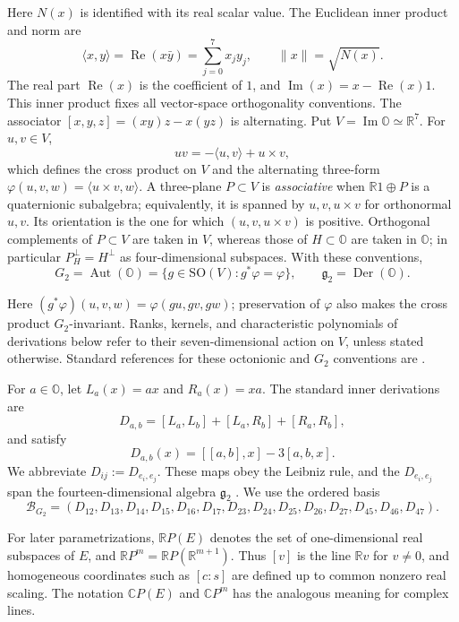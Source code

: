 \documentclass[11pt,a4paper]{article}
\newcommand{\RR}{\mathbb R}
\newcommand{\CC}{\mathbb C}
\newcommand{\OO}{\mathbb O}
\newcommand{\SO}{\mathrm{SO}}
\newcommand{\Aut}{\operatorname{Aut}}
\newcommand{\Der}{\operatorname{Der}}
\newcommand{\imO}{\operatorname{Im}\OO}
\newcommand{\braket}[2]{\langle #1,#2\rangle}
\begin{document}
Here $N(x)$ is identified with its real scalar value.  The Euclidean inner product and norm are
\[
\langle x,y\rangle=\operatorname{Re}(x\bar y)
=\sum_{j=0}^{7}x_jy_j,\qquad \|x\|=\sqrt{N(x)}.
\]
The real part $\operatorname{Re}(x)$ is the coefficient of $1$, and $\operatorname{Im}(x)=x-\operatorname{Re}(x)1$.  This inner product fixes all vector-space orthogonality conventions.
The associator $[x,y,z]=(xy)z-x(yz)$ is alternating.  Put $V=\imO\simeq\RR^7$.  For $u,v\in V$,
\[
uv=-\braket{u}{v}+u\times v,
\]
which defines the cross product on $V$ and the alternating three-form $\varphi(u,v,w)=\braket{u\times v}{w}$.  A three-plane $P\subset V$ is \emph{associative} when $\RR1\oplus P$ is a quaternionic subalgebra; equivalently, it is spanned by $u,v,u\times v$ for orthonormal $u,v$.  Its orientation is the one for which $(u,v,u\times v)$ is positive.  Orthogonal complements of $P\subset V$ are taken in $V$, whereas those of $H\subset\OO$ are taken in $\OO$; in particular $P_H^\perp=H^\perp$ as four-dimensional subspaces.  With these conventions,
\[
G_2=\Aut(\OO)=\{g\in\SO(V):g^*\varphi=\varphi\},
\qquad
\mathfrak g_2=\Der(\OO).
\]

Here $(g^*\varphi)(u,v,w)=\varphi(gu,gv,gw)$; preservation of $\varphi$ also makes the cross product $G_2$-invariant.  Ranks, kernels, and characteristic polynomials of derivations below refer to their seven-dimensional action on $V$, unless stated otherwise.
Standard references for these octonionic and $G_2$ conventions are \cite{Baez2002,SpringerVeldkamp2000,ChemtovKarigiannis2022}.

For $a\in\OO$, let $L_a(x)=ax$ and $R_a(x)=xa$.  The standard inner derivations are
\[
D_{a,b}=[L_a,L_b]+[L_a,R_b]+[R_a,R_b],
\]
and satisfy
\[
D_{a,b}(x)=[[a,b],x]-3[a,b,x].
\]
We abbreviate $D_{ij}:=D_{e_i,e_j}$.  These maps obey the Leibniz rule, and the $D_{e_i,e_j}$ span the fourteen-dimensional algebra $\mathfrak g_2$ \cite{SpringerVeldkamp2000,RauschSlupinski2022}.  We use the ordered basis
\begin{equation}
\mathcal B_{G_2}=(D_{12},D_{13},D_{14},D_{15},D_{16},D_{17},D_{23},D_{24},D_{25},D_{26},D_{27},D_{45},D_{46},D_{47}).
\label{eq:g2basis}
\end{equation}

For later parametrizations, $\RR P(E)$ denotes the set of one-dimensional real subspaces of $E$, and $\RR P^m=\RR P(\RR^{m+1})$.  Thus $[v]$ is the line $\RR v$ for $v\ne0$, and homogeneous coordinates such as $[c:s]$ are defined up to common nonzero real scaling.  The notation $\CC P(E)$ and $\CC P^m$ has the analogous meaning for complex lines.
\end{document}
